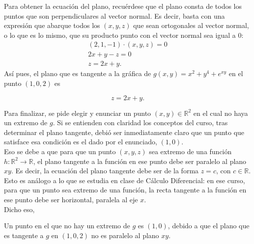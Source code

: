 \documentclass{fmbvecto}
\begin{document}
\begin{problema}
Para obtener la ecuación del plano, recuérdese que el plano consta de todos los puntos que son perpendiculares al vector normal. Es decir, basta con una expresión que abarque todos los \((x, y, z)\) que sean ortogonales al vector normal, o lo que es lo mismo, que su producto punto con el vector normal sea igual a \(0\):
\begin{gather*}
    (2, 1, -1) \cdot (x, y, z) = 0 \\
    2x + y - z = 0 \\
    z = 2x + y.
\end{gather*}
Así pues, el plano que es tangente a la gráfica de \(g(x, y) = x^2+y^4+e^{xy}\) en el punto \((1, 0, 2)\) es
\begin{gbox}
    \[z = 2x + y.\]
\end{gbox}

Para finalizar, se pide elegir y enunciar un punto \((x, y) \in \mathbb{R}^2\) en el cual no haya un extremo de \(g\). Si se entienden con claridad los conceptos del curso, tras determinar el plano tangente, debió ser inmediatamente claro que un punto que satisface esa condición es el dado por el enunciado, \((1, 0)\). \\

Eso se debe a que para que un punto \((x, y, z)\) sea extremo de una función \(h\colon \mathbb{R}^2 \to \mathbb{R}\), el plano tangente a la función en ese punto debe ser paralelo al plano \(xy\). Es decir, la ecuación del plano tangente debe ser de la forma \(z = c\), con \(c \in \mathbb{R}\). Esto es análogo a lo que se estudia en clase de Cálculo Diferencial: en ese curso, para que un punto sea extremo de una función, la recta tangente a la función en ese punto debe ser horizontal, paralela al eje \(x\). \\

Dicho eso,
\begin{gbox}
    Un punto en el que no hay un extremo de \(g\) es \((1, 0)\), debido a que el plano que es tangente a \(g\) en \((1, 0, 2)\) no es paralelo al plano \(xy\).
\end{gbox}
 
\end{problema}

\phantom{} %
\end{document}
